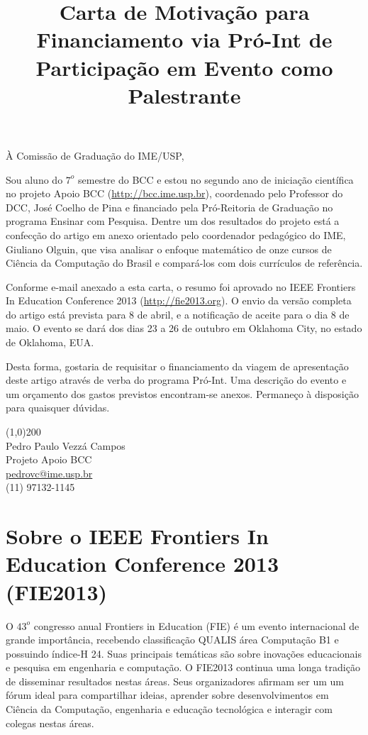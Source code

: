 \documentclass[brazil]{article}
\begin{document}
\title{Carta de Motivação para Financiamento via Pró-Int de Participação em Evento como Palestrante}


\maketitle

\begin{flushleft}
À Comissão de Graduação do IME/USP,
\end{flushleft}



Sou aluno do $7^{o}$ semestre do BCC e estou no segundo ano de iniciação científica no projeto Apoio BCC (\url{http://bcc.ime.usp.br}), coordenado pelo Professor do DCC, José Coelho de Pina e financiado pela Pró-Reitoria de Graduação no programa Ensinar com Pesquisa. Dentre um dos resultados do projeto está a confecção do artigo em anexo orientado pelo coordenador pedagógico do IME, Giuliano Olguin, que visa analisar o enfoque matemático de onze cursos de Ciência da Computação do Brasil e compará-los com dois currículos de referência. 

Conforme e-mail anexado a esta carta, o resumo foi aprovado no IEEE Frontiers In Education Conference 2013 (\url{http://fie2013.org}). O envio da versão completa do artigo está prevista para 8 de abril, e a notificação de aceite para o dia 8 de maio. O evento se dará dos dias 23 a 26 de outubro em Oklahoma City, no estado de Oklahoma, EUA.

Desta forma, gostaria de requisitar o financiamento da viagem de apresentação deste artigo através de verba do programa Pró-Int. Uma descrição do evento e um orçamento dos gastos previstos encontram-se anexos. Permaneço à disposição para quaisquer dúvidas.

\vfill

\begin{flushright}
\line(1,0){200}\\
Pedro Paulo Vezzá Campos\\
Projeto Apoio BCC\\
\url{pedrovc@ime.usp.br}\\
(11) 97132-1145
\end{flushright}

\newpage 

\section{Sobre o IEEE Frontiers In Education Conference 2013 (FIE2013)}
O $43^o$ congresso anual Frontiers in Education (FIE) é um evento internacional de grande importância, recebendo classificação QUALIS área Computação B1 e possuindo índice-H 24. Suas principais temáticas são sobre inovações educacionais e pesquisa em engenharia e computação. O FIE2013 continua uma longa tradição de disseminar resultados nestas áreas. Seus organizadores afirmam ser um um fórum ideal para compartilhar ideias, aprender sobre desenvolvimentos em Ciência da Computação, engenharia e educação tecnológica e interagir com colegas nestas áreas.
\end{document}
